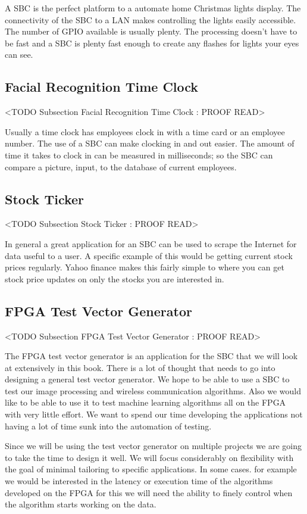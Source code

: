 A \ac{SBC} is the perfect platform to a automate home Christmas lights display. The connectivity of the \ac{SBC} to a \ac{LAN} makes controlling the lights easily accessible. The number of \ac{GPIO} available is usually plenty. The processing doesn't have to be fast and a \ac{SBC} is plenty fast enough to create any flashes for lights your eyes can see. 
	
	
\subsection{Facial Recognition Time Clock}
	<TODO Subsection Facial Recognition Time Clock : PROOF READ>

Usually a time clock has employees clock in with a time card or an employee number. The use of a \ac{SBC} can make clocking in and out easier. The amount of time it takes to clock in can be measured in milliseconds; so the \ac{SBC} can compare a picture, input, to the database of current employees. 
	
\subsection{Stock Ticker}
	<TODO Subsection Stock Ticker : PROOF READ>

In general a great application for an \ac{SBC} can be used to scrape the Internet for data useful to a user. A specific example of this would be getting current stock prices regularly. Yahoo finance makes this fairly simple to where you can get stock price updates on only the stocks you are interested in. 
	
	
\subsection{FPGA Test Vector Generator}
	<TODO Subsection FPGA Test Vector Generator : PROOF READ>

The \ac{FPGA} test vector generator is an application for the \ac{SBC} that we will look at extensively in this book. There is a lot of thought that needs to go into designing a general test vector generator. We hope to be able to use a \ac{SBC} to test our image processing and wireless communication algorithms. Also we would like to be able to use it to test machine learning algorithms all on the \ac{FPGA} with very little effort. We want to spend our time developing the applications not having a lot of time sunk into the automation of testing.

Since we will be using the test vector generator on multiple projects we are going to take the time to design it well. We will focus considerably on flexibility with the goal of minimal tailoring to specific applications. In some cases. for example we would be interested in the latency or execution time of the algorithms developed on the \ac{FPGA} for this we will need the ability to finely control when the algorithm starts working on the data. 

